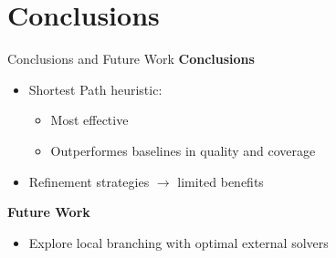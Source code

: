 \documentclass[aspectratio=169,xcolor=dvipsnames]{beamer}
\begin{document}
\section{Conclusions}

\begin{frame}{Conclusions and Future Work}
	\textbf{Conclusions}
	\begin{itemize}
		\item Shortest Path heuristic:
		      \begin{itemize}
			      \item Most effective
			      \item Outperformes baselines in quality and coverage
		      \end{itemize}
		\item Refinement strategies $\rightarrow$ limited benefits
	\end{itemize}
	\textbf{Future Work}
	\begin{itemize}
		\item Explore local branching with optimal external solvers
	\end{itemize}
\end{frame}

\end{document}
